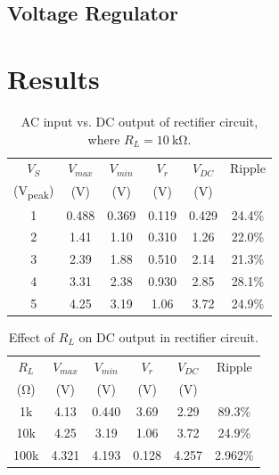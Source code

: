 \documentclass{article}
\begin{document}
\subsection{Voltage Regulator}
\label{sec:volt_reg}


\section{Results}
\label{sec:results}

\begin{table}[hbtp]
  \centering
  \begin{tabular}{cccccc}
    $V_S$ & $V_{max}$ & $V_{min}$ & $V_r$ & $V_{DC}$ & Ripple \\
    (\si{V_{peak}}) & (\si{V}) & (\si{V}) & (\si{V}) & (\si{V}) & \\
    \hline
    1 & 0.488 & 0.369 & 0.119 & 0.429 & 24.4\% \\
    2 & 1.41 & 1.10 & 0.310 & 1.26 & 22.0\% \\
    3 & 2.39 & 1.88 & 0.510 & 2.14 & 21.3\% \\
    4 & 3.31 & 2.38 & 0.930 & 2.85 & 28.1\% \\
    5 & 4.25 & 3.19 & 1.06 & 3.72 & 24.9\% \\
  \end{tabular}
  \caption{\label{tab:rect_vp_vdc} AC input vs. DC output of rectifier circuit, where $R_L=\SI{10}{\kilo\ohm}$.}
\end{table}

\begin{table}[hbtp]
  \centering
  \begin{tabular}{cccccc}
    $R_L$ & $V_{max}$ & $V_{min}$ & $V_r$ & $V_{DC}$ & Ripple \\
    (\si{\ohm}) & (\si{V}) & (\si{V}) & (\si{V}) & (\si{V}) & \\
    \hline
    1k & 4.13 & 0.440 & 3.69 & 2.29 & 89.3\% \\
    10k & 4.25 & 3.19 & 1.06 & 3.72 & 24.9\% \\
    100k & 4.321 & 4.193 & 0.128 & 4.257 & 2.962\% \\
  \end{tabular}
  \caption{\label{tab:load_v_ripple} Effect of $R_L$ on DC output in rectifier circuit.}
\end{table}
\end{document}
